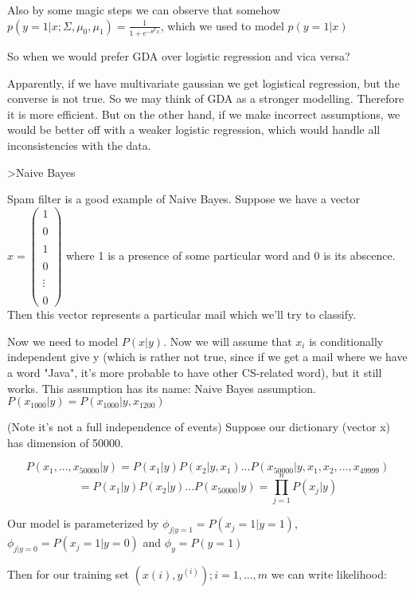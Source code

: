 Also by some magic steps we can observe that somehow $p(y=1 \vert x; \Sigma, \mu_{0}, \mu_{1}) = \frac{1}{1+e^{-\theta^{T}x}}$, which we used to model $p(y=1 \vert x)$

So when we would prefer GDA over logistic regression and vica versa?

Apparently, if we have multivariate gaussian we get logistical regression, but the converse is not true. So we may think of GDA as a stronger modelling. Therefore it is more efficient. But on the other hand, if we make incorrect assumptions, we would be better off with a weaker logistic regression, which would handle all inconsistencies with the data.


>Naive Bayes

Spam filter is a good example of Naive Bayes. Suppose we have a vector $x = \begin{pmatrix} 1 \\\\ 0 \\\\ 1 \\\\ 0 \\\\ \vdots \\\\ 0 \end{pmatrix}$ where 1 is a presence of some particular word and 0 is its abscence. Then this vector represents a particular mail which we'll try to classify.

Now we need to model $P(x \vert y)$. Now we will assume that $x_{i}$ is conditionally independent give y (which is rather not true, since if we get a mail where we have a word "Java", it's more probable to have other CS-related word), but it still works. This assumption has its name: Naive Bayes assumption.
$P(x_{1000} \vert y) = P(x_{1000} \vert y, x_{1200})$

(Note it's not a full independence of events)
Suppose our dictionary (vector x) has dimension of 50000.

$$P(x_{1},...,x_{50000} \vert y)
= P(x_{1} \vert y) P(x_{2} \vert y, x_{1}) ... P(x_{50000} \vert y, x_{1}, x_{2},...,x_{49999})$$
$$= P(x_{1} \vert y)P(x_{2} \vert y)...P(x_{50000} \vert y) = \prod_{j=1}^{n}P(x_{j} \vert y)$$

Our model is parameterized by $\phi_{j \vert y=1} = P(x_{j} = 1 \vert y=1)$,$\phi_{j \vert y=0} = P(x_{j} = 1 \vert y=0)$ and $\phi_{y} = P(y=1)$

Then for our training set {$(x{(i)},y^{(i)}); i = 1,...,m$} we can write likelihood:

